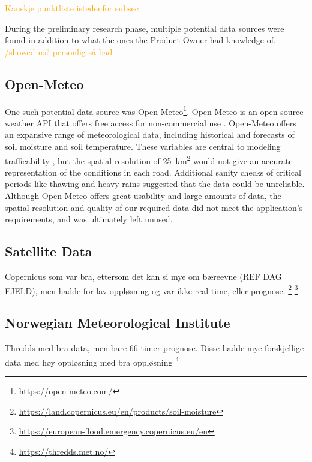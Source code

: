 \textcolor{orange}{Kanskje punktliste istedenfor subsec}

During the preliminary research phase, multiple potential data sources were found in addition to what the ones the Product Owner had knowledge of. \textcolor{orange}{/showed us? personlig så bad}

\subsection{Open-Meteo}

One such potential data source was Open-Meteo\footnote{\url{https://open-meteo.com/}}. Open-Meteo is an open-source weather API that offers free access for non-commercial use \cite{openmeteo}. Open-Meteo offers an expansive range of meteorological data, including historical and forecasts of soil moisture and soil temperature. These variables are central to modeling trafficability \cite{fjeld2023trafficability}, but the spatial resolution of \qty{25}{\kilo\meter\squared} would not give an accurate representation of the conditions in each road. Additional sanity checks of critical periods like thawing and heavy rains suggested that the data could be unreliable. Although Open-Meteo offers great usability and large amounts of data, the spatial resolution and quality of our required data did not meet the application's requirements, and was ultimately left unused. 

\subsection{Satellite Data}

Copernicus som var bra, ettersom det kan si mye om bæreevne (REF DAG FJELD), men hadde for lav oppløsning og var ikke real-time, eller prognose.
\footnote{\url{https://land.copernicus.eu/en/products/soil-moisture}}
\footnote{\url{https://european-flood.emergency.copernicus.eu/en}}

\subsection{Norwegian Meteorological Institute}

Thredds med bra data, men bare 66 timer prognose. Disse hadde mye forskjellige data med høy oppløsning med bra oppløsning
\footnote{\url{https://thredds.met.no/}}
